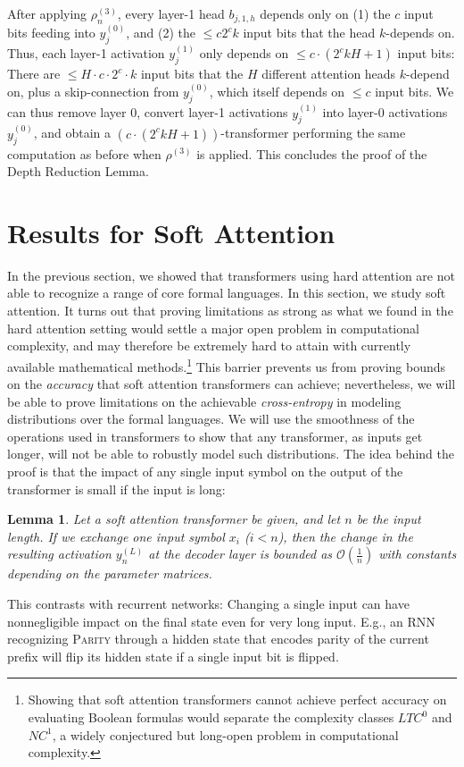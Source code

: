 \documentclass[11pt,a4paper]{article}
\newcounter{theorem}
\newtheorem{lemma}[theorem]{Lemma}
\begin{document}
After applying $\rho^{(3)}_n$, every layer-1 head $b_{j,1,h}$ depends only on (1) the $c$ input bits feeding into $y_j^{(0)}$, and (2) the $\leq c2^ck$ input bits that the head $k$-depends on.
Thus, each layer-1 activation $y_j^{(1)}$ only depends on $\leq c\cdot (2^ckH+1)$ input bits: There are $\leq H\cdot c \cdot 2^c \cdot k$ input bits that the $H$ different attention heads $k$-depend on, plus a skip-connection from $y_j^{(0)}$, which itself depends on $\leq c$ input bits.
We can thus remove layer 0, convert layer-1 activations $y_j^{(1)}$ into layer-0 activations $y_j^{(0)}$, and obtain a $(c\cdot(2^ckH+1))$-transformer performing the same computation as before when $\rho^{(3)}$ is applied.
This concludes the proof of the Depth Reduction Lemma.





\section{Results for Soft Attention}\label{sec:soft}

In the previous section, we showed that transformers using hard attention are not able to recognize a range of core formal languages.
In this section, we study soft attention.
It turns out that proving limitations as strong as what we found in the hard attention setting would settle a major open problem in computational complexity, and  may therefore be extremely hard to attain with currently available mathematical methods.\footnote{Showing that soft attention transformers cannot achieve perfect accuracy on evaluating Boolean formulas would separate the complexity classes $LTC^0$ and $NC^1$, a widely conjectured but long-open problem in computational complexity.}
This barrier prevents us from proving bounds on the \emph{accuracy} that soft attention transformers can achieve; nevertheless, we will be able to prove limitations on the achievable \emph{cross-entropy} in modeling distributions over the formal languages.
We will use the smoothness of the operations used in transformers to show that any transformer, as inputs get longer, will not be able to robustly model such distributions.
The idea behind the proof is that the impact of any single input symbol on the output of the transformer is small if the input is long:
\begin{lemma}\label{lem:soft-tech}
Let a soft attention transformer be given, and let $n$ be the input length.
If we exchange one input symbol $x_i$ ($i < n$), %
then the change in the resulting activation $y_n^{(L)}$ at the decoder layer is bounded as $\mathcal{O}(\frac{1}{n})$ with constants depending on the parameter matrices.
\end{lemma}
This contrasts with recurrent networks:
Changing a single input can have nonnegligible impact on the final state even for very long input.
E.g., an RNN recognizing \textsc{Parity} through a hidden state that encodes parity of the current prefix will flip its hidden state if a single input bit is flipped.
\end{document}

